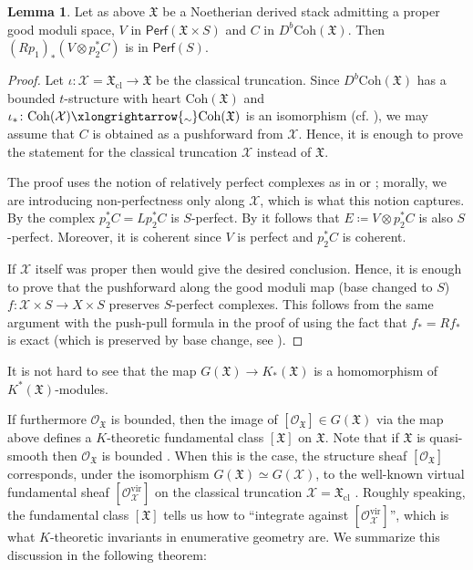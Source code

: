 \documentclass[12pt]{amsart}
\theoremstyle{definition}
\newtheorem{lemma}[definition]{Lemma}
\newcommand{\CO}{{\mathcal O}}
\newcommand{\CX}{{\mathcal X}}
\newcommand{\1}{\mathbf 1}
\newcommand{\FX}{{\mathfrak{X}}}
\newcommand{\Coh}{\mathrm{Coh}}
\newcommand{\Perf}{\mathsf{Perf}}
\newcommand{\vir}{\mathrm{vir}}
\newcommand{\cl}{\mathrm{cl}}
\newcommand{\isoto}{\xlongrightarrow{\raisebox{-0.3ex}[0pt][0pt]{\(\scriptstyle\sim\)}}}
\begin{document}
\begin{lemma}\label{lem: gtokhom}
Let as above $\FX$ be a Noetherian derived stack admitting a proper good moduli space, $V$ in $\Perf(\FX\times S)$ and $C$ in $D^b\Coh(\FX)$. Then  $(Rp_{1})_\ast (V\otimes p_2^\ast C)$ is in $\Perf(S)$.
\end{lemma}
\begin{proof}
    Let $\iota\colon \CX=\FX_\cl\to \FX$ be the classical truncation. Since $D^b\Coh(\FX)$ has a bounded $t$-structure with heart $\Coh(\FX)$ and $\iota_\ast\colon \Coh(\CX)\isoto \Coh(\FX)$ is an isomorphism (cf. \cite[Proposition 3.3, Corollary 3.4]{khan}), we may assume that $C$ is obtained as a pushforward from $\CX$. Hence, it is enough to prove the statement for the classical truncation $\CX$ instead of $\FX$.
    
    The proof uses the notion of relatively perfect complexes as in \cite{lieblich} or \cite[Section 0DHZ]{stacks}; morally, we are introducing non-perfectness only along $\CX$, which is what this notion captures. By \cite[Example 0DI1, Lemma 0DI5]{stacks} the complex $p_2^\ast C=Lp_2^\ast C$ is $S$-perfect. By \cite[Lemma 0DI4]{stacks} it follows that $E\coloneqq V\otimes p_2^\ast C$ is also $S$-perfect. Moreover, it is coherent since $V$ is perfect and $p_2^\ast C$ is coherent.

If $\CX$ itself was proper then \cite[Lemma 0DJT]{stacks} would give the desired conclusion. Hence, it is enough to prove that the pushforward along the good moduli map (base changed to $S$) $f\colon \CX\times S\to X\times S$ preserves $S$-perfect complexes. This follows from the same argument with the push-pull formula in the proof of \cite[Lemma 08EV]{stacks} using the fact that $f_\ast=Rf_\ast$ is exact (which is preserved by base change, see \cite[Proposition 3.9 (iv)]{alper}).\qedhere
\end{proof}

It is not hard to see that the map $G(\FX)\to K_\ast(\FX)$ is a homomorphism of $K^\ast(\FX)$-modules.

If furthermore $\CO_\FX$ is bounded, then the image of $[\CO_\FX]\in G(\FX)$ via the map above defines a $K$-theoretic fundamental class $[\FX]$ on $\FX$. Note that if $\FX$ is quasi-smooth then $\CO_\FX$ is bounded \cite[Corollary 6.1]{khan}. When this is the case, the structure sheaf $[\CO_\FX]$ corresponds, under the isomorphism $G(\FX)\simeq G(\CX)$, to the well-known virtual fundamental sheaf $[\CO_{\CX}^\vir]$ on the classical truncation $\CX=\FX_\cl$ \cite{BF, leeQK}. Roughly speaking, the fundamental class $[\FX]$ tells us how to ``integrate against $[\CO_{\CX}^\vir]$'', which is what $K$-theoretic invariants in enumerative geometry are. We summarize this discussion in the following theorem:
\end{document}
